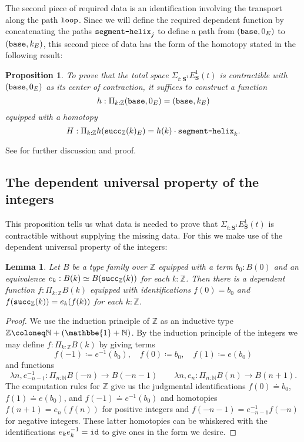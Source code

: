 \documentclass{amsart}
\theoremstyle{theorem}
\newtheorem*{lem}{Lemma}
\newtheorem*{prop}{Proposition}
\theoremstyle{definition}
\theoremstyle{remark}
\newcommand{\0}{\mathbbe{0}}
\newcommand{\1}{\mathbbe{1}}
\newcommand{\2}{\mathbbe{2}}
\newcommand{\3}{\mathbbe{3}}
\newcommand{\4}{\mathbbe{4}}
\newcommand{\NN}{\mathbb{N}}
\newcommand{\ZZ}{\mathbb{Z}}
\newcommand{\term}[1]{{\textup{\texttt{#1}}}}
\newcommand{\id}{\term{id}}
\newcommand{\Sone}{\mathbf{S}^1}
\newcommand{\base}{\term{base}}
\newcommand{\lloop}{\term{loop}}
\begin{document}
The second piece of required data is an identification involving the transport along the path $\lloop$. Since we will define the required dependent function by concatenating the paths $\term{segment-helix}_j$ to define a path from $(\base,0_E)$ to $(\base,k_E)$, this second piece of data has the form of the homotopy stated in the following result:

\begin{prop} To prove that the total space $\Sigma_{t: \Sone} E_\Sone(t)$ is contractible with $(\base,0_E)$ as its center of contraction, it suffices to construct a function
\[ h :  \Pi_{k :\ZZ} (\base,0_E) = (\base,k_E) \]
equipped with a homotopy
\[ H : \Pi_{k : \ZZ} h(\term{succ}_\ZZ(k)_E) = h(k) \cdot \term{segment-helix}_k.\]
\end{prop}

See \cite[\S 21.3]{Rijke} for further discussion and proof.

\subsection*{The dependent universal property of the integers}

This proposition tells us what data is needed to prove that $\Sigma_{t: \Sone} E_\Sone(t)$ is contractible without supplying the missing data. For this we make use of the dependent universal property of the integers:

\begin{lem} Let $B$ be a type family over $\ZZ$ equipped with a term $b_0 : B(0)$ and an equivalence $e_k : B(k) \simeq B(\term{succ}_\ZZ(k))$ for each $k : \ZZ$. Then there is a dependent function $f : \Pi_{k:\ZZ}B(k)$ equipped with identifications $f(0) = b_0$ and $f(\term{succ}_\ZZ(k)) = e_k(f(k))$ for each $k : \ZZ$.
\end{lem}
\begin{proof}
We use the induction principle of $\ZZ$ as an inductive type $\ZZ \coloneq \NN + (\1 + \NN)$. By the induction principle of the integers we may define $f: \Pi_{k : \ZZ}B(k)$ by giving terms
\[ f(-1) \coloneq e^{-1}(b_0), \quad f(0) \coloneq b_0 , \quad f(1) \coloneq e(b_0)\]
and functions
\[ \lambda n, e^{-1}_{-n-1} : \Pi_{n : \NN} B(-n) \to B(-n-1) \qquad \lambda n, e_n : \Pi_{n : \NN} B(n) \to B(n+1).\]
The computation rules for $\ZZ$ give us the judgmental identifications $f(0) \doteq b_0$, $f(1) \doteq e(b_0)$, and $f(-1) \doteq e^{-1}(b_0)$ and homotopies $f(n+1)=e_n (f(n))$ for positive integers and $f(-n-1) = e_{-n-1}^{-1} f(-n)$ for negative integers. These latter homotopies can be whiskered with the identifications $e_ke_k^{-1} = \id$ to give ones in the form we desire.
\end{proof}
\end{document}
